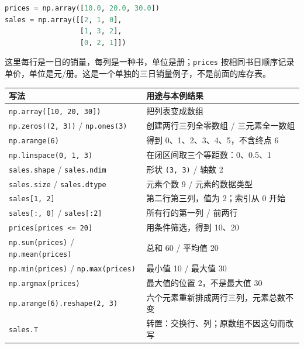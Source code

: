 \documentclass[UTF8,a4paper,11pt,fontset=fandol]{ctexart}
\providecommand{\passthrough}[1]{#1}
\begin{document}
\begin{lstlisting}[language=Python]
prices = np.array([10.0, 20.0, 30.0])
sales = np.array([[2, 1, 0],
                  [1, 3, 2],
                  [0, 2, 1]])
\end{lstlisting}

这里每行是一日的销量，每列是一种书，单位是册；\passthrough{\lstinline!prices!} 按相同书目顺序记录单价，单位是元/册。这是一个单独的三日销量例子，不是前面的库存表。

\begin{longtable}[]{@{}
  >{\raggedright\arraybackslash}p{}
  >{\raggedright\arraybackslash}p{}@{}}
\toprule\noalign{}
\begin{minipage}[b]{\linewidth}\raggedright
写法
\end{minipage} & \begin{minipage}[b]{\linewidth}\raggedright
用途与本例结果
\end{minipage} \\
\midrule\noalign{}
\endhead
\bottomrule\noalign{}
\endlastfoot
\passthrough{\lstinline!np.array([10, 20, 30])!} & 把列表变成数组 \\
\passthrough{\lstinline!np.zeros((2, 3))!} / \passthrough{\lstinline!np.ones(3)!} & 创建两行三列全零数组 / 三元素全一数组 \\
\passthrough{\lstinline!np.arange(6)!} & 得到 0、1、2、3、4、5，不含终点 6 \\
\passthrough{\lstinline!np.linspace(0, 1, 3)!} & 在闭区间取三个等距数：0、0.5、1 \\
\passthrough{\lstinline!sales.shape!} / \passthrough{\lstinline!sales.ndim!} & 形状 \passthrough{\lstinline!(3, 3)!} / 轴数 2 \\
\passthrough{\lstinline!sales.size!} / \passthrough{\lstinline!sales.dtype!} & 元素个数 9 / 元素的数据类型 \\
\passthrough{\lstinline!sales[1, 2]!} & 第二行第三列，值为 2；索引从 0 开始 \\
\passthrough{\lstinline!sales[:, 0]!} / \passthrough{\lstinline!sales[:2]!} & 所有行的第一列 / 前两行 \\
\passthrough{\lstinline!prices[prices <= 20]!} & 用条件筛选，得到 10、20 \\
\passthrough{\lstinline!np.sum(prices)!} / \passthrough{\lstinline!np.mean(prices)!} & 总和 60 / 平均值 20 \\
\passthrough{\lstinline!np.min(prices)!} / \passthrough{\lstinline!np.max(prices)!} & 最小值 10 / 最大值 30 \\
\passthrough{\lstinline!np.argmax(prices)!} & 最大值的位置 2，不是最大值 30 \\
\passthrough{\lstinline!np.arange(6).reshape(2, 3)!} & 六个元素重新排成两行三列，元素总数不变 \\
\passthrough{\lstinline!sales.T!} & 转置：交换行、列；原数组不因这句而改写 \\
\end{longtable}
\end{document}
